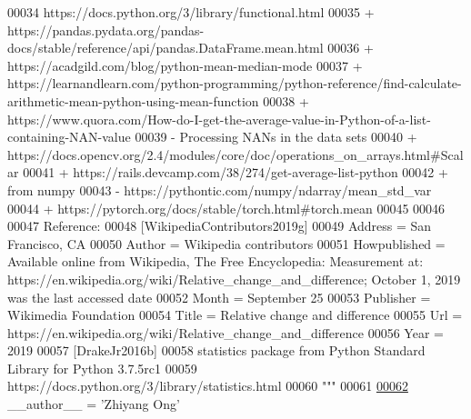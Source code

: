 \begin{DoxyCode}
00034 \textcolor{stringliteral}{        https://docs.python.org/3/library/functional.html}
00035 \textcolor{stringliteral}{    + https://pandas.pydata.org/pandas-docs/stable/reference/api/pandas.DataFrame.mean.html}
00036 \textcolor{stringliteral}{    + https://acadgild.com/blog/python-mean-median-mode}
00037 \textcolor{stringliteral}{    +
       https://learnandlearn.com/python-programming/python-reference/find-calculate-arithmetic-mean-python-using-mean-function}
00038 \textcolor{stringliteral}{    + https://www.quora.com/How-do-I-get-the-average-value-in-Python-of-a-list-containing-NAN-value}
00039 \textcolor{stringliteral}{        - Processing NANs in the data sets }
00040 \textcolor{stringliteral}{    +
       https://docs.opencv.org/2.4/modules/core/doc/operations\_on\_arrays.html#Scalar%
00041 \textcolor{stringliteral}{    + https://rails.devcamp.com/38/274/get-average-list-python}
00042 \textcolor{stringliteral}{    + from numpy}
00043 \textcolor{stringliteral}{        - https://pythontic.com/numpy/ndarray/mean\_std\_var}
00044 \textcolor{stringliteral}{    + https://pytorch.org/docs/stable/torch.html#torch.mean}
00045 \textcolor{stringliteral}{    }
00046 \textcolor{stringliteral}{}
00047 \textcolor{stringliteral}{    Reference:}
00048 \textcolor{stringliteral}{    [WikipediaContributors2019g]}
00049 \textcolor{stringliteral}{        Address = San Francisco, CA}
00050 \textcolor{stringliteral}{        Author = Wikipedia contributors}
00051 \textcolor{stringliteral}{        Howpublished = Available online from Wikipedia, The Free Encyclopedia: Measurement at:
       https://en.wikipedia.org/wiki/Relative\_change\_and\_difference; October 1, 2019 was the last accessed date}
00052 \textcolor{stringliteral}{        Month = September 25}
00053 \textcolor{stringliteral}{        Publisher = Wikimedia Foundation}
00054 \textcolor{stringliteral}{        Title = Relative change and difference}
00055 \textcolor{stringliteral}{        Url = https://en.wikipedia.org/wiki/Relative\_change\_and\_difference}
00056 \textcolor{stringliteral}{        Year = 2019}
00057 \textcolor{stringliteral}{    [DrakeJr2016b]}
00058 \textcolor{stringliteral}{        statistics package from Python Standard Library for Python 3.7.5rc1}
00059 \textcolor{stringliteral}{        https://docs.python.org/3/library/statistics.html}
00060 \textcolor{stringliteral}{"""}
00061 
\hypertarget{data__analysis__tool_8py_source_l00062}{}\hyperlink{namespacestatistics_1_1data__analysis__tool_a0d015dff70798eb64719348296063f84}{00062} \_\_author\_\_ = \textcolor{stringliteral}{'Zhiyang Ong'}
}
\end{DoxyCode}
